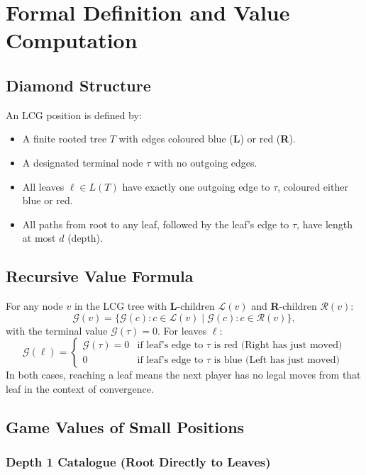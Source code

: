 \documentclass[10pt,a4paper,twocolumn]{article}
\newcommand{\Lopt}[1]{{\color{lblue}\textbf{#1}}}
\newcommand{\Ropt}[1]{{\color{rred}\textbf{#1}}}
\newcommand{\Gv}[1]{\mathcal{G}(#1)}
\theoremstyle{plain}
\theoremstyle{definition}
\theoremstyle{remark}
\begin{document}
\section{Formal Definition and Value Computation}

\subsection{Diamond Structure}

An LCG position is defined by:
\begin{itemize}
\item A finite rooted tree $T$ with edges coloured blue (\Lopt{L}) or red (\Ropt{R}).
\item A designated terminal node $\tau$ with no outgoing edges.
\item All leaves $\ell \in L(T)$ have exactly one outgoing edge to $\tau$, coloured either blue or red.
\item All paths from root to any leaf, followed by the leaf's edge to $\tau$, have length at most $d$ (depth).
\end{itemize}

\subsection{Recursive Value Formula}

For any node $v$ in the LCG tree with \Lopt{L}-children $\mathcal{L}(v)$ and \Ropt{R}-children $\mathcal{R}(v)$:
\[
\Gv{v} = \bigl\{ \Gv{c} : c \in \mathcal{L}(v) \;\big|\; \Gv{c} : c \in \mathcal{R}(v) \bigr\},
\]
with the terminal value $\Gv{\tau} = 0$. For leaves $\ell$:
\[
\Gv{\ell} = \begin{cases}
\Gv{\tau} = 0 & \text{if leaf's edge to } \tau \text{ is red (Right has just moved)} \\
0 & \text{if leaf's edge to } \tau \text{ is blue (Left has just moved)}
\end{cases}
\]
In both cases, reaching a leaf means the next player has no legal moves from that leaf in the context of convergence.

\subsection{Game Values of Small Positions}

\subsubsection{Depth 1 Catalogue (Root Directly to Leaves)}
\end{document}
